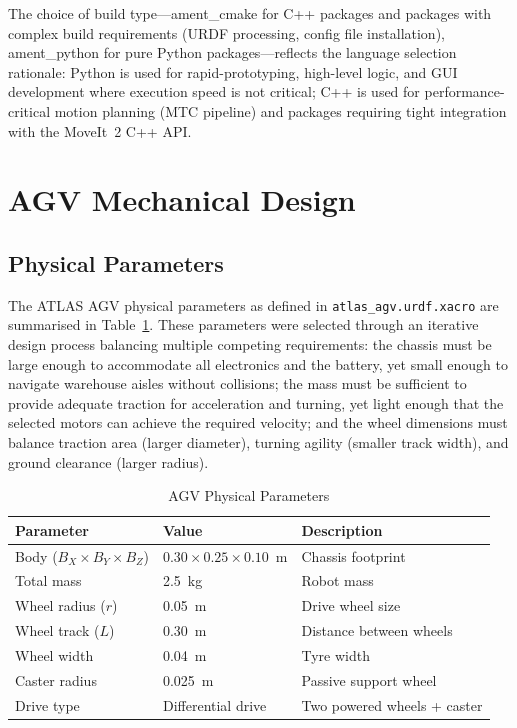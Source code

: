 \documentclass[12pt,a4paper,oneside]{report}
\begin{document}
The choice of build type---ament\_cmake for C++ packages and packages with complex build requirements (URDF processing, config file installation), ament\_python for pure Python packages---reflects the language selection rationale: Python is used for rapid-prototyping, high-level logic, and GUI development where execution speed is not critical; C++ is used for performance-critical motion planning (MTC pipeline) and packages requiring tight integration with the MoveIt~2 C++ API.

\section{AGV Mechanical Design}

\subsection{Physical Parameters}

The ATLAS AGV physical parameters as defined in \texttt{atlas\_agv.urdf.xacro} are summarised in Table~\ref{tab:physical}. These parameters were selected through an iterative design process balancing multiple competing requirements: the chassis must be large enough to accommodate all electronics and the battery, yet small enough to navigate warehouse aisles without collisions; the mass must be sufficient to provide adequate traction for acceleration and turning, yet light enough that the selected motors can achieve the required velocity; and the wheel dimensions must balance traction area (larger diameter), turning agility (smaller track width), and ground clearance (larger radius).

\begin{table}[H]
\centering
\caption{AGV Physical Parameters}
\label{tab:physical}
\begin{tabular}{p{4.5cm} p{3.5cm} p{5cm}}
\toprule
\textbf{Parameter} & \textbf{Value} & \textbf{Description} \\
\midrule
Body ($B_X \times B_Y \times B_Z$) & $0.30 \times 0.25 \times 0.10$~m & Chassis footprint \\
Total mass & 2.5~kg & Robot mass \\
Wheel radius ($r$) & 0.05~m & Drive wheel size \\
Wheel track ($L$) & 0.30~m & Distance between wheels \\
Wheel width & 0.04~m & Tyre width \\
Caster radius & 0.025~m & Passive support wheel \\
Drive type & Differential drive & Two powered wheels + caster \\
\bottomrule
\end{tabular}
\end{table}
\end{document}
